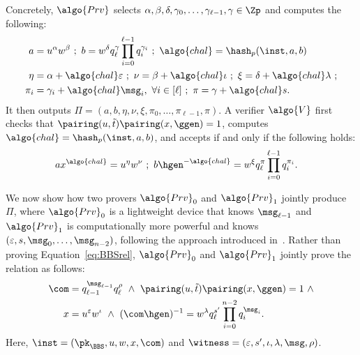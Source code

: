 Concretely, $\algo{Prv}$ selects $\alpha, \beta, \delta, \gamma_0, \ldots,
\gamma_{\ell-1}, \gamma \in \Zp$ and computes the following:
%
\begin{align*}
%
  a &= u^\alpha w^\beta \ ; \ b = w^\delta q_\ell^\gamma \prod_{i=0}^{\ell-1}
  q_i^{\gamma_i} \ ; \ \algo{chal} = \hash_p(\inst, a, b) \\
  \eta &= \alpha + \algo{chal} \varepsilon \ ; \ \nu = \beta + \algo{chal}
  \iota \ ; \ \xi = \delta + \algo{chal} \lambda \ ; \\
  \pi_i &= \gamma_i + \algo{chal} \msg_i, \ \forall i \in [\ell] \ ; \ \pi =
  \gamma + \algo{chal} s.
\end{align*}
%
It then outputs $\Pi = (a, b, \eta, \nu, \xi, \pi_0, \ldots, \pi_{\ell-1},
\pi)$.  A verifier $\algo{V}$ first checks that $\pairing(u, \tilde{t})
\pairing(x, \ggen) = 1$, computes $\algo{chal} = \hash_p(\inst, a, b)$, and
accepts if and only if the following holds:
%
\begin{align*}
%
  a x^\algo{chal} &= u^\eta w^\nu \ ; \ b \hgen^{-\algo{chal}} = w^\xi
  q_\ell^\pi \prod_{i=0}^{\ell-1} q_i^{\pi_i}.
\end{align*}

We now show how two provers $\algo{Prv}_0$ and $\algo{Prv}_1$ jointly produce
$\Pi$, where $\algo{Prv}_0$ is a lightweight device that knows $\msg_{\ell-1}$
and $\algo{Prv}_1$ is computationally more powerful and knows $(\varepsilon, s,
\msg_0, \ldots, \msg_{n-2})$, following the approach introduced
in~\cite{USENIX:HesSinSor23}. Rather than proving Equation~\eqref{eq:BBSrel},
$\algo{Prv}_0$ and $\algo{Prv}_1$ jointly prove the relation as follows:
%
\begin{align*}
%
  \com &= q_{\ell-1}^{\msg_{\ell-1}} q_\ell^\rho \ \wedge \ \pairing(u,
  \tilde{t}) \pairing(x, \ggen) = 1 \ \wedge \\
  x &= u^\varepsilon w^\iota \ \wedge \ (\com \hgen)^{-1} = w^\lambda
  q_\ell^{s'} \prod_{i=0}^{n-2} q_i^{\msg_i}.
\end{align*}
%
Here, $\inst = (\pk_{\BBS}, u, w, x, \com)$ and $\witness = (\varepsilon, s',
\iota, \lambda, \msg, \rho)$.

